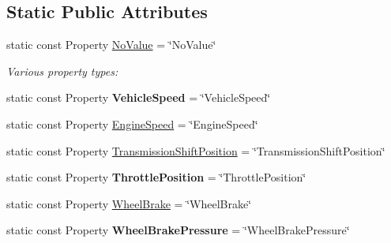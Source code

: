 \subsection*{Static Public Attributes}
\begin{DoxyCompactItemize}
\item 
static const Property \hyperlink{classVehicleProperty_ae013e9c1f3fb57d646211d3e6bb4ca9e}{No\-Value} = \char`\"{}No\-Value\char`\"{}
\begin{DoxyCompactList}\small\item\em Various property types\-: \end{DoxyCompactList}\item 
\hypertarget{classVehicleProperty_af457ed63f945a7f6b4e074f3ba8b904f}{static const Property {\bfseries Vehicle\-Speed} = \char`\"{}Vehicle\-Speed\char`\"{}}\label{classVehicleProperty_af457ed63f945a7f6b4e074f3ba8b904f}

\item 
static const Property \hyperlink{classVehicleProperty_a7949fe3d031814fc2644de14f8cec9a0}{Engine\-Speed} = \char`\"{}Engine\-Speed\char`\"{}
\item 
static const Property \hyperlink{classVehicleProperty_ae486d9ea26918460822086b797018800}{Transmission\-Shift\-Position} = \char`\"{}Transmission\-Shift\-Position\char`\"{}
\item 
\hypertarget{classVehicleProperty_a0ac93e18603ccf0ebf214b2712785100}{static const Property {\bfseries Throttle\-Position} = \char`\"{}Throttle\-Position\char`\"{}}\label{classVehicleProperty_a0ac93e18603ccf0ebf214b2712785100}

\item 
static const Property \hyperlink{classVehicleProperty_ad4f1ec038bee5ef30fbf8308aaba2794}{Wheel\-Brake} = \char`\"{}Wheel\-Brake\char`\"{}
\item 
\hypertarget{classVehicleProperty_a617cc19f62d99f7f72a047d5066dcd96}{static const Property {\bfseries Wheel\-Brake\-Pressure} = \char`\"{}Wheel\-Brake\-Pressure\char`\"{}}\label{classVehicleProperty_a617cc19f62d99f7f72a047d5066dcd96}


\end{DoxyCompactItemize}
